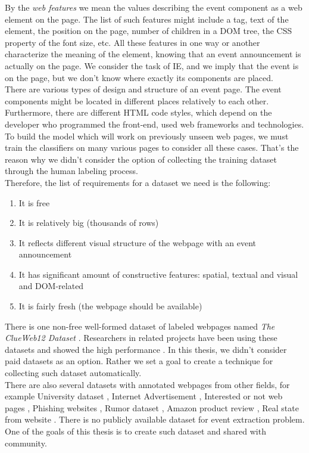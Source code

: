 By the \textit{web features} we mean the values describing the event component as a web element on the page. The list of such features might include a tag, text of the element, the position on the page, number of children in a DOM tree, the CSS property of the font size, etc. All these features in one way or another characterize the meaning of the element, knowing that an event announcement is actually on the page. We consider the task of IE, and we imply that the event is on the page, but we don't know where exactly its components are placed.\\

There are various types of design and structure of an event page. The event components might be located in different places relatively to each other. Furthermore, there are different HTML code styles, which depend on the developer who programmed the front-end, used web frameworks and technologies. To build the model which will work on previously unseen web pages, we must train the classifiers on many various pages to consider all these cases. That's the reason why we didn't consider the option of collecting the training dataset through the human labeling process.\\

Therefore, the list of requirements for a dataset we need is the following: 

\begin{enumerate}
    \item It is free
    \item It is relatively big (thousands of rows)
    \item It reflects different visual structure of the webpage with an event announcement
    \item It has significant amount of constructive features: spatial, textual and visual and DOM-related
    \item It is fairly fresh (the webpage should be available)
\end{enumerate}

There is one non-free well-formed dataset of labeled webpages named \textit{The ClueWeb12 Dataset} \cite{ClueWeb12}. Researchers in related projects have been using these datasets and showed the high performance \cite{GoogEvent}. In this thesis, we didn't consider paid datasets as an option. Rather we set a goal to create a technique for collecting such dataset automatically.\\

There are also several datasets with annotated webpages from other fields, for example University dataset \cite{datUni}, Internet Advertisement \cite{datAd}, Interested or not web pages \cite{datInterest}, Phishing websites \cite{datFhishing}, Rumor dataset \cite{datRumor}, Amazon product review \cite{datAmazon}, Real state from website \cite{datReal}. There is no publicly available dataset for event extraction problem. One of the goals of this thesis is to create such dataset and shared with community.

